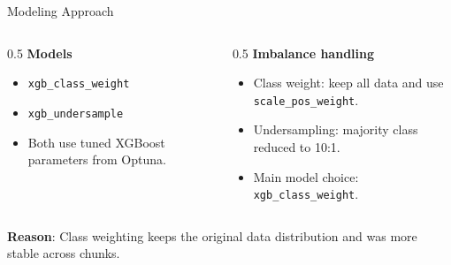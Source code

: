 \documentclass{beamer}
\begin{document}
\begin{frame}{Modeling Approach}
    \begin{columns}
        \begin{column}{0.5\textwidth}
            \textbf{Models}
            \begin{itemize}
                \item \texttt{xgb\_class\_weight}
                \item \texttt{xgb\_undersample}
                \item Both use tuned XGBoost parameters from Optuna.
            \end{itemize}
        \end{column}
        \begin{column}{0.5\textwidth}
            \textbf{Imbalance handling}
            \begin{itemize}
                \item Class weight: keep all data and use \texttt{scale\_pos\_weight}.
                \item Undersampling: majority class reduced to 10:1.
                \item Main model choice: \texttt{xgb\_class\_weight}.
            \end{itemize}
        \end{column}
    \end{columns}

    \vspace{0.4cm}
    \textbf{Reason}: Class weighting keeps the original data distribution and was more stable across chunks.
\end{frame}
\end{document}
